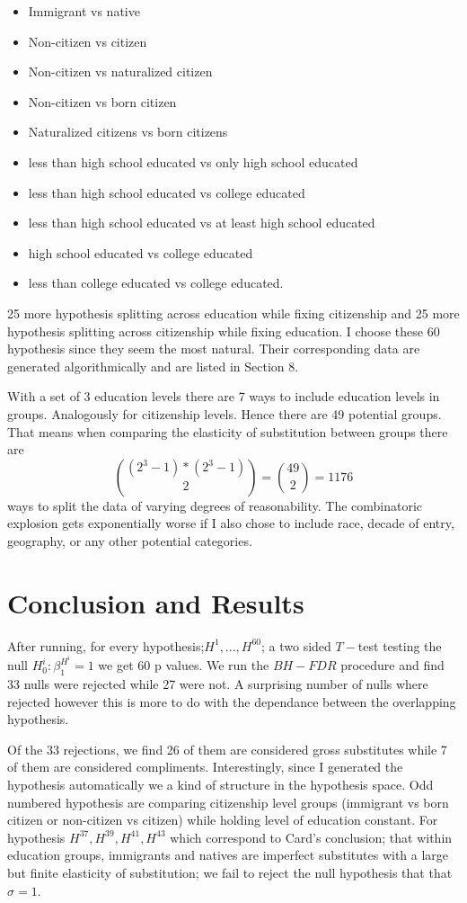 \documentclass[11pt]{article}
\theoremstyle{definition}
\theoremstyle{remark}
\def\b{\beta}
\def\s{\sigma}
\begin{document}
\begin{itemize}
    \item Immigrant vs native
    \item Non-citizen vs citizen
    \item Non-citizen vs naturalized citizen
    \item Non-citizen vs born citizen
    \item Naturalized citizens vs born citizens
    \item less than high school educated vs only high school educated
    \item less than high school educated vs college educated
    \item less than high school educated vs at least high school educated
    \item high school educated vs college educated
    \item less than college educated vs college educated.
\end{itemize}

25 more hypothesis splitting across education while fixing citizenship
and 25 more hypothesis splitting across citizenship while fixing education.
I choose these 60 hypothesis since they seem the most natural. Their corresponding
data are generated algorithmically and are listed in Section 8. 

With a set of 3 education levels there are 7 ways to include education levels
in groups. Analogously for citizenship levels. Hence there are 49 potential groups.
That means when comparing the elasticity of substitution between groups there are
$${(2^3-1) * (2^3-1) \choose 2} = {49\choose 2} = 1176$$
ways to split the data
of varying degrees of reasonability. The combinatoric explosion gets exponentially
worse if I also chose to include race, decade of entry, geography, or any other
potential categories.


\section{Conclusion and Results}

After running, for every hypothesis;$H^1,...,H^{60}$; a two sided $T-$test testing
the null $H_0^i:\b^{H^i}_1 = 1$ we get 60 p values. We run the $BH-FDR$ procedure
and find 33 nulls were rejected while 27 were not. A surprising number of nulls
where rejected however this is more to do with the dependance between the
overlapping hypothesis.

Of the 33 rejections, we find 26 of them are considered gross substitutes while
7 of them are considered compliments. Interestingly, since I generated the
hypothesis automatically we a kind of structure in the hypothesis space.
Odd numbered hypothesis are comparing citizenship level groups
(immigrant vs born citizen or non-citizen vs citizen) while holding level of
education constant. For hypothesis $H^{37},H^{39},H^{41},H^{43}$ which correspond
to Card's conclusion; that within education groups, immigrants and natives
are imperfect substitutes with a large but finite elasticity of substitution;
we fail to reject the null hypothesis that that $\s=1$.
\end{document}
